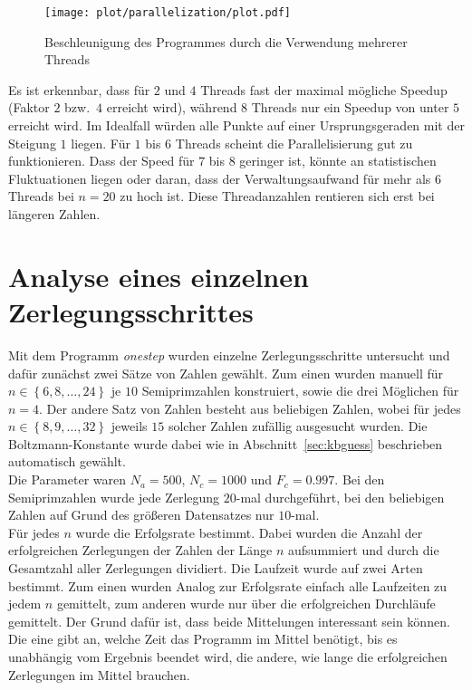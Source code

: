 \begin{figure}[!ht]
		\centering
		\texttt{[image: plot/parallelization/plot.pdf]}
		\caption{Beschleunigung des Programmes durch die Verwendung mehrerer Threads}\label{fig:speedup}
\end{figure}

Es ist erkennbar, dass für $2$ und $4$ Threads fast der maximal mögliche Speedup (Faktor $2$ bzw.\ $4$ erreicht wird), während $8$ Threads nur ein Speedup von unter $5$ erreicht wird. Im Idealfall würden alle Punkte auf einer Ursprungsgeraden mit der Steigung $1$ liegen. Für $1$ bis $6$ Threads scheint die Parallelisierung gut zu funktionieren. Dass der Speed für $7$ bis $8$ geringer ist, könnte an statistischen Fluktuationen liegen oder daran, dass der Verwaltungsaufwand für mehr als $6$ Threads bei $n=20$ zu hoch ist. Diese Threadanzahlen rentieren sich erst bei längeren Zahlen.

\section{Analyse eines einzelnen Zerlegungsschrittes}
Mit dem Programm \textit{onestep} wurden einzelne Zerlegungsschritte untersucht und dafür zunächst zwei Sätze von Zahlen gewählt. Zum einen wurden manuell für $n\in\left\{6,8,\dots,24\right\}$ je $10$ Semiprimzahlen konstruiert, sowie die drei Möglichen für $n=4$. Der andere Satz von Zahlen besteht aus beliebigen Zahlen, wobei für jedes $n\in\left\{8,9,\dots,32\right\}$ jeweils $15$ solcher Zahlen zufällig ausgesucht wurden. Die Boltzmann-Konstante wurde dabei wie in Abschnitt~\ref{sec:kbguess} beschrieben automatisch gewählt.\\
Die Parameter waren $N_a=500$, $N_c=1000$ und $F_c=0.997$. Bei den Semiprimzahlen wurde jede Zerlegung $20$-mal durchgeführt, bei den beliebigen Zahlen auf Grund des größeren Datensatzes nur $10$-mal. \\
Für jedes $n$ wurde die Erfolgsrate bestimmt. Dabei wurden die Anzahl der erfolgreichen Zerlegungen der Zahlen der Länge $n$ aufsummiert und durch die Gesamtzahl aller Zerlegungen dividiert. Die Laufzeit wurde auf zwei Arten bestimmt. Zum einen wurden Analog zur Erfolgsrate einfach alle Laufzeiten zu jedem $n$ gemittelt, zum anderen wurde nur über die erfolgreichen Durchläufe gemittelt. Der Grund dafür ist, dass beide Mittelungen interessant sein können. Die eine gibt an, welche Zeit das Programm im Mittel benötigt, bis es unabhängig vom Ergebnis beendet wird, die andere, wie lange die erfolgreichen Zerlegungen im Mittel brauchen.\\

